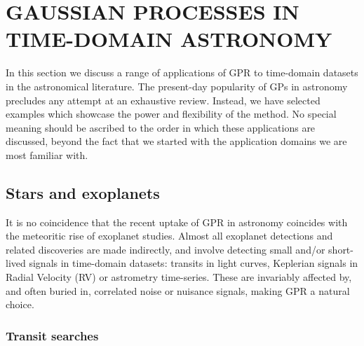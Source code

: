 \documentclass[letterpaper]{ar-1col}
\begin{document}
\section{GAUSSIAN PROCESSES IN TIME-DOMAIN ASTRONOMY}
\label{sec:uses}

In this section we discuss a range of applications of GPR to time-domain datasets in the astronomical literature. The present-day popularity of GPs in astronomy precludes any attempt at an exhaustive review. Instead, we have selected examples which showcase the power and flexibility of the method. No special meaning should be ascribed to the order in which these applications are discussed, beyond the fact that we started with the application domains we are most familiar with.


\subsection{Stars and exoplanets}
\label{sec:stars_planets}

It is no coincidence that the recent uptake of GPR in astronomy coincides with the meteoritic rise of exoplanet studies. Almost all exoplanet detections and related discoveries are made indirectly, and involve detecting small and/or short-lived signals in time-domain datasets: transits in light curves, Keplerian signals in Radial Velocity (RV) or astrometry time-series. These are invariably affected by, and often buried in, correlated noise or nuisance signals, making GPR a natural choice.


\subsubsection{Transit searches}
\label{sec:transit_det}
\end{document}
